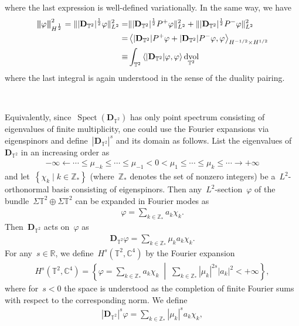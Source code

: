 \documentclass[11pt,final]{amsart}
\newcommand{\tnorm}[1]{%
  \left\vert\kern-0.3ex\left\vert\kern-0.3ex\left\vert #1 \right\vert\kern-0.3ex\right\vert\kern-0.3ex\right\vert
}
\newcommand{\R}{\mathbb{R}}
\newcommand{\C}{\mathbb{C}}
\newcommand{\T}{\mathbb{T}}
\newcommand{\dd}{\mathop{}\!\mathrm{d}}
\newcommand{\pD}{\mathbf{D}}
\newcommand{\Abracket}[1]{\left<#1\right>} %
\newcommand{\braces}[1]{\left\{#1\right\}} %
\DeclareMathOperator{\dv}{\dd{vol}}
\DeclareMathOperator{\Spect}{Spect}
\begin{document}
where the last expression is well-defined variationally.  
In the same way, we have 
\begin{align}
    \tnorm{\varphi}_{H^{\frac{1}{2}}}^2 = \| |\pD_{\T^2}|^{\frac{1}{2}}\varphi \|_{L^2}^2 
    =&\| |\pD_{\T^2}|^{\frac{1}{2}}P^+\varphi\|_{L^2}^2 
     + \| |\pD_{\T^2}|^{\frac{1}{2}}P^-\varphi\|_{L^2}^2 \\
     =& \Abracket{|\pD_{\T^2}|P^+\varphi +|\pD_{\T^2}|P^-\varphi ,\varphi}_{H^{-1/2}\times H^{1/2}} \\
     \equiv & \int_{\T^2}\Abracket{|\pD_{\T^2}|\varphi,\varphi}\dv_{\T^2}
\end{align}
where the last integral is again understood in the sense of the duality pairing. 


\ 

Equivalently, since~$\Spect(\pD_{\T^2})$ has only point spectrum consisting of eigenvalues of finite multiplicity, one could use the Fourier expansions via eigenspinors and define~$|\pD_{\T^2}|^s$ and its domain as follows. 
List the eigenvalues of~$\pD_{\T^2}$ in an increasing order as 
\begin{align}
    -\infty \leftarrow \cdots \leq 
    \mu_{-k}\leq \cdots \leq \mu_{-1} <0 < \mu_1 \leq \cdots \leq \mu_k \leq \cdots \to +\infty
\end{align}
and let~$\braces{ \chi_k\mid k \in\mathbb{Z}_*}$ (where~$\mathbb{Z}_*$ denotes the set of nonzero integers) be a~$L^2$-orthonormal basis consisting of eigenspinors. 
Then any~$L^2$-section~$\varphi$ of the bundle~$\Sigma\T^2 \oplus \Sigma\T^2$ can be expanded in Fourier modes as 
\begin{align}
    \varphi=\sum_{k\in \mathbb{Z}_*} a_k \chi_k. 
\end{align}
Then~$\pD_{\T^2}$ acts on~$\varphi$ as
\begin{align}
    \pD_{\T^2}\varphi=\sum_{k\in\mathbb{Z}_*} \mu_k a_k \chi_k.
\end{align}
For any~$s\in\R$, we define~$H^s(\T^2,\C^4)$ by the Fourier expansion
\begin{align}
    H^s(\T^2,\C^4)
    =
    \braces{
        \varphi=\sum_{k\in\mathbb Z_*}a_k\chi_k
        \;\middle|\;
        \sum_{k\in\mathbb Z_*}|\mu_k|^{2s}|a_k|^2<+\infty
    },
\end{align}
where for~$s<0$ the space is understood as the completion of finite
Fourier sums with respect to the corresponding norm.
We define
\begin{align}
    |\pD_{\T^2}|^s\varphi
    =
    \sum_{k\in\mathbb Z_*}|\mu_k|^s a_k\chi_k,
\end{align}
\end{document}
